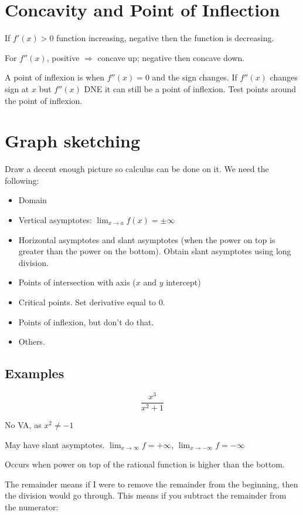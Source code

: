\documentclass[12pt]{article}
\theoremstyle{plain}
\theoremstyle{remark}
\theoremstyle{definition}
\begin{document}
\section{Concavity and Point of
Inflection}

If \(f'(x) > 0\) function increasing, negative then the function is
decreasing.

For \(f''(x)\), positive \(\Rightarrow\) concave up; negative then
concave down.

A point of inflexion is when \(f''(x) = 0\) and the sign changes. If
\(f''(x)\) changes sign at \(x\) but \(f''(x)\) DNE it can still
be a point of inflexion. Test points around the point of inflexion.


\section{Graph sketching}

Draw a decent enough picture so calculus can be done on it. We need the
following:

\begin{itemize}
\item
  Domain
\item
  Vertical asymptotes: \(\lim_{x \rightarrow a}{f(x)} = \pm \infty\)
\item
  Horizontal asymptotes and slant asymptotes (when the power on top is
  greater than the power on the bottom). Obtain slant asymptotes using
  long division.
\item
  Points of intersection with axis (\(x\) and \(y\) intercept)
\item
  Critical points. Set derivative equal to 0.
\item
  Points of inflexion, but don't do that.
\item
  Others.
\end{itemize}


\subsection{Examples}

\[\frac{x^{3}}{x^{2} + 1}\]

No VA, as \(x^{2} \neq - 1\)

May have slant asymptotes. \(\lim_{x \rightarrow \infty}f = + \infty\),
\(\lim_{x \rightarrow - \infty}f = - \infty\)

Occurs when power on top of the rational function is higher than the
bottom.


The remainder means if I were to remove the remainder from the
beginning, then the division would go through. This means if you
subtract the remainder from the numerator:
\end{document}
